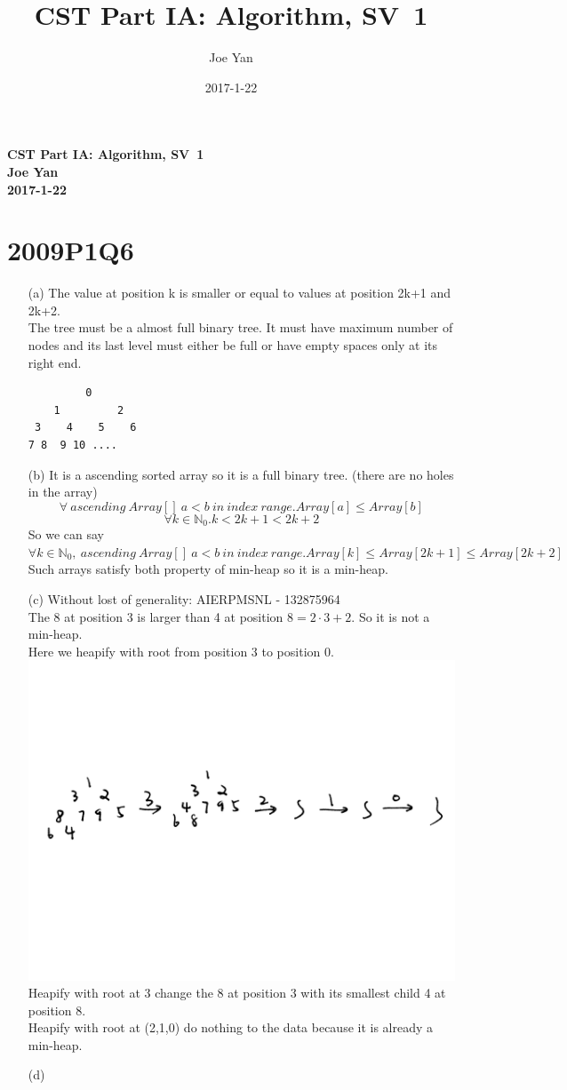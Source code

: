 \documentclass[10pt,twoside,a4paper]{article}
\newcommand{\studentname}{Joe Yan}
\newcommand{\svworkdate}{2017-1-22}
\newcommand{\svcourse}{CST Part IA: Algorithm}
\newcommand{\svnumber}{1}
\begin{document}
\author{\studentname}
\title{\svcourse, SV~\svnumber}
\date{\svworkdate}

\textbf{\svcourse, SV~\svnumber}\\
\textbf{\studentname}\\
\textbf{\svworkdate}\\

\section{2009P1Q6}
\begin{itemize}
\item[(a)]
The value at position k is smaller or equal to values at position 2k+1 and 2k+2.\\
The tree must be a almost full binary tree. It must have maximum number of nodes and its last level must either be full or have empty spaces only at its right end.\\
\begin{lstlisting}
         0
    1         2
 3    4    5    6
7 8  9 10 ....
\end{lstlisting}
\item[(b)]
It is a ascending sorted array so it is a full binary tree. (there are no holes in the array)\\
$$\forall \ ascending\  Array[]\ a<b\ in\ index\ range. Array[a]\leq Array[b]$$
$$\forall k\in \mathbb{N}_0.k<2k+1<2k+2$$
So we can say $\forall k\in \mathbb{N}_0, \ ascending\  Array[]\ a<b\ in\ index\ range. Array[k]\leq Array[2k+1]\leq Array[2k+2]$\\
Such arrays satisfy both property of min-heap so it is a min-heap.
\item[(c)]
Without lost of generality: AIERPMSNL - 132875964\\
The 8 at position 3 is larger than 4 at position $8=2\cdot 3 +2$. So it is not a min-heap.\\
Here we heapify with root from position 3 to position 0.\\
\includegraphics[scale=0.1]{SV2a.png}
Heapify with root at 3 change the 8 at position 3 with its smallest child 4 at position 8.\\
Heapify with root at (2,1,0) do nothing to the data because it is already a min-heap.
\item[(d)]


\end{itemize}
\end{document}
